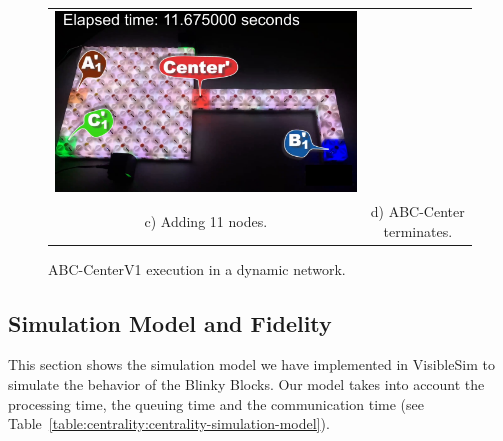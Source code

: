 {\begin{figure}[h!]
\begin{tabular}{c c}
			\includegraphics[width=\subFigureWidth]{images/centrality/abc-centerv1-dynamics/3}\\
			c) Adding 11 nodes. & d) ABC-Center terminates.\\
		\end{tabular}	
		\caption{ABC-CenterV1 execution in a dynamic network.\label{fig:centrality:abc-center-network-dyanmics}}
	\end{figure}
}

\subsection{Simulation Model and Fidelity}

This section shows the simulation model we have implemented in VisibleSim to simulate the behavior of the Blinky Blocks. Our model takes into account the processing time, the queuing time and the communication time (see Table~\ref{table:centrality:centrality-simulation-model}).

